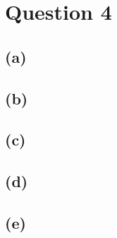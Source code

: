 \section{Question 4}
    \subsection{(a)}
    \subsection{(b)}
    \subsection{(c)}
    \subsection{(d)}
    \subsection{(e)}
